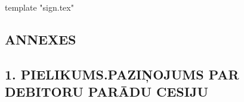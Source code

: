 \documentclass[a4paper]{article}
\begin{document}
\vspace{5mm}

{{template "sign.tex"}}

\begin{center}
  \section{ANNEXES}
\end{center}

\vspace{1cm}

\subsection{1. PIELIKUMS.PAZIŅOJUMS PAR DEBITORU PARĀDU CESIJU}

\vspace{2mm}
\end{document}
